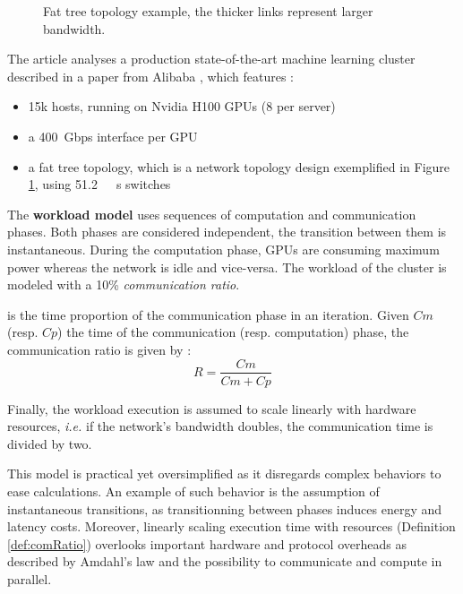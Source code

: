\begin{figure}
\begin{center}
	\end{center}
	\caption{Fat tree topology example, the thicker links represent larger bandwidth.}\label{fig:fatTree}
\end{figure}


The article analyses a production state-of-the-art machine learning cluster described in a paper from Alibaba \cite{MLCluster}, which features :
\begin{itemize}
	\item 15k hosts, running on Nvidia H100 GPUs (8 per server)
	\item a \qty{400}{Gbps} interface per GPU 
	\item a fat tree topology, which is a network topology design exemplified in Figure \ref{fig:fatTree}, using \qty{51.2}{\tera\bit\s} switches
\end{itemize}

The \textbf{workload model} uses sequences of computation and communication phases.
Both phases are considered independent, the transition between them is instantaneous.
During the computation phase, GPUs are consuming maximum power whereas the network is idle and vice-versa.  
The workload of the cluster is modeled with a 10\% \textit{communication ratio}.
\begin{definition}\label{def:comRatio}
is the time proportion of the communication phase in an iteration.
Given $Cm$ (resp. $Cp$) the time of the communication (resp. computation) phase, the communication ratio is given by :
	$$ R = \frac{Cm}{Cm+Cp}$$
\end{definition}
Finally, the workload execution is assumed to scale linearly with hardware resources, \textit{i.e.} if the network's bandwidth doubles, the communication time is divided by two.

This model is practical yet oversimplified as it disregards complex behaviors to ease calculations. 
An example of such behavior is the assumption of instantaneous transitions, as transitionning between phases induces energy and latency costs.
Moreover, linearly scaling execution time with resources (Definition \ref{def:comRatio}) overlooks important hardware and protocol overheads as described by Amdahl's law \cite{AmdahlLaw} and the possibility to communicate and compute in parallel.     

